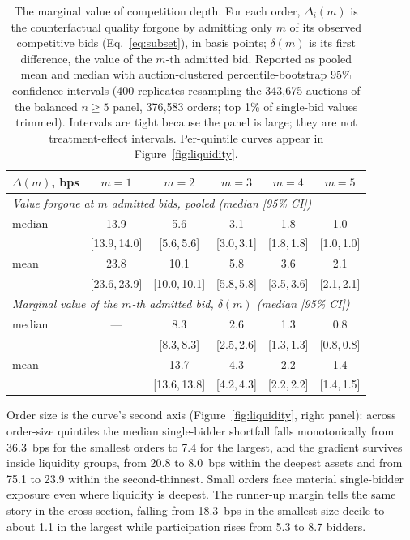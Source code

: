 \documentclass[11pt]{article}
\theoremstyle{plain}
\theoremstyle{definition}
\theoremstyle{remark}
\begin{document}
\begin{table}[t]
\centering
{\fontsize{10}{12}\selectfont
\begin{tabular}{lccccc}
\toprule
$\Delta(m)$, bps & $m=1$ & $m=2$ & $m=3$ & $m=4$ & $m=5$ \\
\midrule
\multicolumn{6}{l}{\emph{Value forgone at $m$ admitted bids, pooled (median [95\% CI])}} \\
median & 13.9 & 5.6 & 3.1 & 1.8 & 1.0 \\
       & \tiny[13.9,\,14.0] & \tiny[5.6,\,5.6] & \tiny[3.0,\,3.1] & \tiny[1.8,\,1.8] & \tiny[1.0,\,1.0] \\
mean   & 23.8 & 10.1 & 5.8 & 3.6 & 2.1 \\
       & \tiny[23.6,\,23.9] & \tiny[10.0,\,10.1] & \tiny[5.8,\,5.8] & \tiny[3.5,\,3.6] & \tiny[2.1,\,2.1] \\
\midrule
\multicolumn{6}{l}{\emph{Marginal value of the $m$-th admitted bid, $\delta(m)$ (median [95\% CI])}} \\
median & --- & 8.3 & 2.6 & 1.3 & 0.8 \\
       & & \tiny[8.3,\,8.3] & \tiny[2.5,\,2.6] & \tiny[1.3,\,1.3] & \tiny[0.8,\,0.8] \\
mean   & --- & 13.7 & 4.3 & 2.2 & 1.4 \\
       & & \tiny[13.6,\,13.8] & \tiny[4.2,\,4.3] & \tiny[2.2,\,2.2] & \tiny[1.4,\,1.5] \\
\bottomrule
\end{tabular}}
\caption{The marginal value of competition depth. For each order, $\Delta_i(m)$ is the counterfactual quality forgone by admitting only $m$ of its observed competitive bids (Eq.~\eqref{eq:subset}), in basis points; $\delta(m)$ is its first difference, the value of the $m$-th admitted bid. Reported as pooled mean and median with auction-clustered percentile-bootstrap 95\% confidence intervals (400 replicates resampling the 343{,}675 auctions of the balanced $n\ge5$ panel, 376{,}583 orders; top 1\% of single-bid values trimmed). Intervals are tight because the panel is large; they are not treatment-effect intervals. Per-quintile curves appear in Figure~\ref{fig:liquidity}.}
\label{tab:shortfall}
\end{table}

Order size is the curve's second axis (Figure~\ref{fig:liquidity}, right panel): across order-size quintiles the median single-bidder shortfall falls monotonically from 36.3~bps for the smallest orders to 7.4 for the largest, and the gradient survives inside liquidity groups, from 20.8 to 8.0~bps within the deepest assets and from 75.1 to 23.9 within the second-thinnest. Small orders face material single-bidder exposure even where liquidity is deepest. The runner-up margin tells the same story in the cross-section, falling from 18.3~bps in the smallest size decile to about 1.1 in the largest while participation rises from 5.3 to 8.7 bidders.
\end{document}
